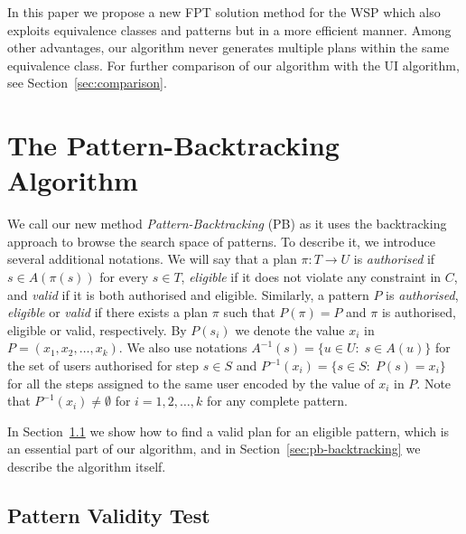 \documentclass[runningheads,proof]{llncs}
\begin{document}
In this paper we propose a new FPT solution method for the WSP which also exploits equivalence classes and patterns but in a more efficient manner.  
Among other advantages, our algorithm never generates multiple plans within the same equivalence class.  
For further comparison of our algorithm with the UI algorithm, see Section~\ref{sec:comparison}.


























\section{The Pattern-Backtracking Algorithm}
\label{sec:pb}

We call our new method \emph{Pattern-Backtracking} (PB) as it uses the backtracking approach to browse the search space of patterns.
To describe it, we introduce several additional notations.
We will say that a plan $\pi : T \rightarrow U$ is \emph{authorised} if $s \in A(\pi(s))$ for every $s \in T$, \emph{eligible} if it does not violate any constraint in $C$, and \emph{valid} if it is both authorised and eligible.
Similarly, a pattern $P$ is \emph{authorised}, \emph{eligible} or \emph{valid} if there exists a plan $\pi$ such that $P(\pi) = P$ and $\pi$ is authorised, eligible or valid, respectively.
By $P(s_i)$ we denote the value $x_i$ in $P = (x_1, x_2, \ldots, x_k)$.  
We also use notations $A^{-1}(s) = \{ u \in U :\; s \in A(u) \}$ for the set of users authorised for step $s \in S$ and $P^{-1}(x_i) = \{ s \in S :\; P(s) = x_i \}$ for all the steps assigned to the same user encoded by the value of $x_i$ in $P$\@.
Note that $P^{-1}(x_i) \neq \emptyset$ for $i = 1, 2, \ldots, k$ for any complete pattern.





In Section~\ref{sec:pattern-validity} we show how to find a valid plan for an eligible pattern, which is an essential part of our algorithm, and in Section~\ref{sec:pb-backtracking} we describe the algorithm itself.


\subsection{Pattern Validity Test}
\label{sec:pattern-validity}
\end{document}
